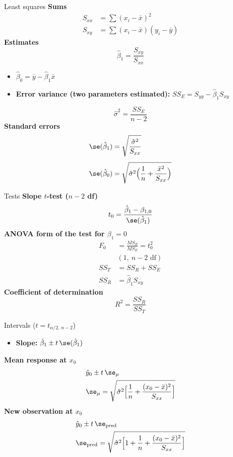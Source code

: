 \begin{formulabox}{Least squares}
\textbf{Sums}
\[ \begin{aligned}S_{xx}&=\sum(x_i-\bar{x})^2\\ S_{xy}&=\sum(x_i-\bar{x})(y_i-\bar{y})\end{aligned} \]
\textbf{Estimates}
\[ \hat\beta_1=\frac{S_{xy}}{S_{xx}} \]
\begin{itemize}
  \item $\hat\beta_0=\bar{y}-\hat\beta_1\bar{x}$
  \item \textbf{Error variance (two parameters estimated):} $SS_E=S_{yy}-\hat\beta_1S_{xy}$
\end{itemize}
\[ \hat\sigma^2=\frac{SS_E}{n-2} \]
\textbf{Standard errors}
\[ \begin{aligned}\se(\hat\beta_1)&=\sqrt{\frac{\hat\sigma^2}{S_{xx}}}\\[4pt] \se(\hat\beta_0)&=\sqrt{\hat\sigma^2\Big(\frac1n+\frac{\bar{x}^2}{S_{xx}}\Big)}\end{aligned} \]
\end{formulabox}

\begin{formulabox}{Tests}
\textbf{Slope $t$-test ($n-2$ df)}
\[ t_0=\frac{\hat\beta_1-\beta_{1,0}}{\se(\hat\beta_1)} \]
\textbf{ANOVA form of the test for $\beta_1=0$}
\[ \begin{aligned}F_0&=\frac{MS_R}{MS_E}=t_0^2\\ &(1,\ n-2\text{ df})\\ SS_T&=SS_R+SS_E\\ SS_R&=\hat\beta_1S_{xy}\end{aligned} \]
\textbf{Coefficient of determination}
\[ R^2=\frac{SS_R}{SS_T} \]
\end{formulabox}

\begin{formulabox}{Intervals ($t=t_{\alpha/2,\,n-2}$)}
\begin{itemize}
  \item \textbf{Slope:} $\hat\beta_1\pm t\,\se(\hat\beta_1)$
\end{itemize}
\textbf{Mean response at $x_0$}
\[ \begin{aligned}&\hat{y}_0\pm t\,\se_{\mu}\\ &\se_{\mu}=\sqrt{\hat\sigma^2\Big[\frac1n+\frac{(x_0-\bar{x})^2}{S_{xx}}\Big]}\end{aligned} \]
\textbf{New observation at $x_0$}
\[ \begin{aligned}&\hat{y}_0\pm t\,\se_{\text{pred}}\\ &\se_{\text{pred}}=\sqrt{\hat\sigma^2\Big[1+\frac1n+\frac{(x_0-\bar{x})^2}{S_{xx}}\Big]}\end{aligned} \]
\end{formulabox}

